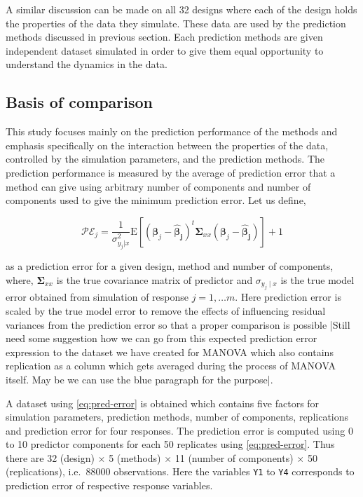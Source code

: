 \documentclass[12pt,3p,authoryear]{elsarticle}
\begin{document}
A similar discussion can be made on all 32 designs where each of the
design holds the properties of the data they simulate. These data are
used by the prediction methods discussed in previous section. Each
prediction methods are given independent dataset simulated in order to
give them equal opportunity to understand the dynamics in the data.

\subsection{Basis of comparison}\label{basis-of-comparison}

This study focuses mainly on the prediction performance of the methods
and emphasis specifically on the interaction between the properties of
the data, controlled by the simulation parameters, and the prediction
methods. The prediction performance is measured by the average of
prediction error that a method can give using arbitrary number of
components and number of components used to give the minimum prediction
error. Let us define,

\begin{equation}
\mathcal{PE}_j = \frac{1}{\sigma_{y_j|x}^2}\mathrm{E}\left[\left(\boldsymbol{\beta}_j - \boldsymbol{\hat{\beta}_j}\right)^t\boldsymbol{\Sigma}_{xx}\left(\boldsymbol{\beta}_j - \boldsymbol{\hat{\beta}_j}\right)\right] + 1
\label{eq:pred-error}
\end{equation}

as a prediction error for a given design, method and number of
components, where, \(\boldsymbol{\Sigma}_{xx}\) is the true covariance
matrix of predictor and \(\sigma_{y_j\mid x}\) is the true model error
obtained from simulation of response \(j = 1, \ldots m\). Here
prediction error is scaled by the true model error to remove the effects
of influencing residual variances from the prediction error so that a
proper comparison is possible
\alert{|Still need some suggestion how we can go from this expected prediction error expression to the dataset we have created for MANOVA which also contains replication as a column which gets averaged during the process of MANOVA itself. May be we can use the blue paragraph for the purpose|}.

A dataset using \eqref{eq:pred-error} is obtained which contains five
factors for simulation parameters, prediction methods, number of
components, replications and prediction error for four responses. The
prediction error is computed using 0 to 10 predictor components for each
50 replicates using \eqref{eq:pred-error}. Thus there are 32 (design)
\(\times\) 5 (methods) \(\times\) 11 (number of components) \(\times\)
50 (replications), i.e.~88000 observations. Here the variables
\texttt{Y1} to \texttt{Y4} corresponds to prediction error of respective
response variables.
\end{document}
